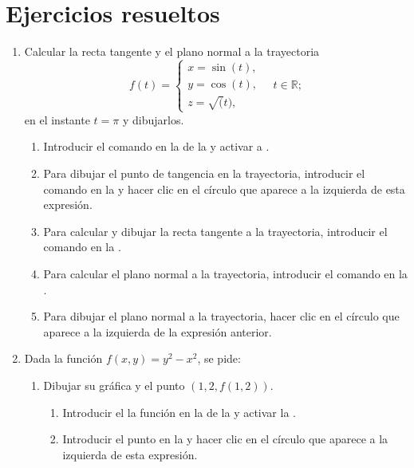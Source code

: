 \section{Ejercicios resueltos}
\begin{enumerate}[leftmargin=*]
\item Calcular la recta tangente y el plano normal a la trayectoria
      \[
      f(t)=
      \begin{cases}
      x=\sin(t), \\
      y=\cos(t), \\
      z=\sqrt(t),
      \end{cases}
      \quad t\in \mathbb{R};
      \]
      en el instante $t=\pi$ y dibujarlos.

      \begin{indication}
      \begin{enumerate}
      \item Introducir el comando  en la  de la  y activar a .
      \item Para dibujar el punto de tangencia en la trayectoria, introducir el comando  en la  y hacer clic en el círculo que aparece a la izquierda de esta expresión.
      \item Para calcular y dibujar la recta tangente a la trayectoria, introducir el comando  en la .
      \item Para calcular el plano normal a la trayectoria, introducir el comando  en la .
      \item Para dibujar el plano normal a la trayectoria, hacer clic en el círculo que aparece a la izquierda de la expresión anterior.
      \end{enumerate}
      \end{indication}

\item Dada la función $f(x,y)=y^2-x^2$, se pide:
      \begin{enumerate}
      \item Dibujar su gráfica y el punto $(1,2,f(1,2))$.
            \begin{indication}
            \begin{enumerate}
            \item Introducir el la función  en la  de la  y activar la .
            \item Introducir el punto  en la  y hacer clic en el círculo que aparece a la izquierda de esta expresión.
            \end{enumerate}


\end{indication}
\end{enumerate}
\end{enumerate}
